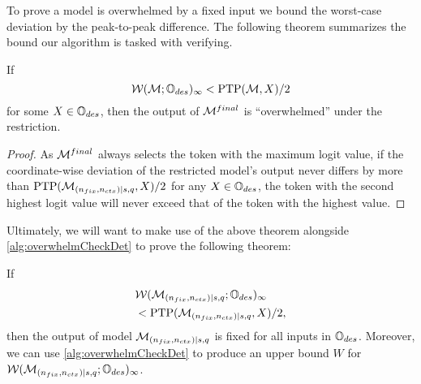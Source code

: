 \iffalse
\begin{algorithm}[H] \label{alg:overwhelmCheck}
	\SetKwInOut{Input}{Input}\SetKwInOut{Output}{Output}
	\Input{A fixed single-layer transformer model $\Model$, a string of tokens $s$ denoting a fixed part of the input to $\Model$, integer $\nfree$ denoting the number of free tokens in the input to $\Model$, and a final query token $q$
	}
	\Output{Either the string ``Overwhelmed'' indicating that the output of the model $\Model$ evaluated on $s$ concatenated with $\nfree$ free tokens and query token $q$ is proven to be invariant under the choice of the free tokens, OR the string ``Inconclusive'' if no such proof is obtained.} 

	Calculate a bound $W$ such that $\WD(\vec{e}_\nctx \cdot \desF{\Model}, X) \leq W$ \\
	\If{
		$
		W < \peakToPeak(\desF{\Model}, \InpSpace) / 2
	$ }{\Return ``Overwhelmed''  }

	\Else{\Return ``Inconclusive''}
	\caption{Overwhelmed Verifier - Algorithm Sketch }
\end{algorithm} 
\fi

To prove a model is overwhelmed by a fixed input we bound the worst-case deviation by the peak-to-peak difference.
The following theorem summarizes the bound our algorithm is tasked with verifying. 
\begin{theorem} \label{thm:metathm}
        If
        \[
		\mathcal{W}(\mathcal{M}; \mathbb{O}_{des})_\infty < \mathrm{PTP}(\mathcal{M}, X) / 2
	\]
        for some $X \in \mathbb{O}_{des}$,
	then the output of $\mathcal{M}^{final}$ is ``overwhelmed'' under the restriction.
\end{theorem}
\begin{proof}
	As $\mathcal{M}^{final}$ always selects the token with the maximum logit value, if the coordinate-wise deviation of the restricted model's output never differs by more than $\mathrm{PTP}(\mathcal{M}_{(n_{fix}, {n_{ctx}}) \mid {s}, q}, X) / 2$ for any $X \in \mathbb{O}_{des}$, the token with the second highest logit value will never exceed that of the token with the highest value.
\end{proof}

Ultimately, we will want to make use of the above theorem alongside \cref{alg:overwhelmCheckDet} to prove the following theorem:
\begin{theorem} \label{thm:InpRes}
	If
    \begin{align*}
	    &\mathcal{W}(\mathcal{M}_{(n_{fix}, {n_{ctx}}) \mid {s}, q}; \mathbb{O}_{des})_\infty
        \\&< \mathrm{PTP}(\mathcal{M}_{(n_{fix}, {n_{ctx}}) \mid {s}, q}, X) / 2,
    \end{align*}
	then the output of model $\mathcal{M}_{(n_{fix}, {n_{ctx}}) \mid {s}, q}$ is fixed for all inputs in $\mathbb{O}_{des}$.
	Moreover, we can use \cref{alg:overwhelmCheckDet} to produce an upper bound $W$ for $\mathcal{W}(\mathcal{M}_{(n_{fix}, {n_{ctx}}) \mid {s}, q}; \mathbb{O}_{des})_\infty$.
\end{theorem}

